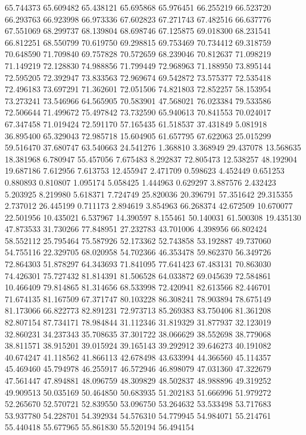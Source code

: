 65.744373
65.609482
65.438121
65.695868
65.976451
66.255219
66.523720
66.293763
66.923998
66.973336
67.602823
67.271743
67.482516
66.637776
67.551069
68.299737
68.139804
68.698746
67.125875
69.018300
68.231541
66.812251
68.550799
70.619750
69.298815
69.753469
70.734412
69.318759
70.648590
71.709840
69.757828
70.572659
68.239046
70.812637
71.098219
71.149219
72.128830
74.988856
71.799449
72.968963
71.188950
73.895144
72.595205
72.392947
73.833563
72.969674
69.542872
73.575377
72.535418
72.496183
73.697291
71.362601
72.051506
74.821803
72.852257
58.153954
73.273241
73.546966
64.565905
70.583901
47.568021
76.023384
79.533586
72.506644
71.499672
75.497842
73.732590
65.940613
70.841553
70.024017
67.347458
71.019424
72.591170
57.165435
61.518537
37.431849
5.081918
36.895400
65.329043
72.985718
15.604905
61.657795
67.622063
25.015299
59.516470
37.680747
63.540663
24.541276
1.368810
3.368949
29.437078
13.568635
18.381968
6.780947
55.457056
7.675483
8.292837
72.805473
12.538257
48.192904
19.687186
7.612956
7.613753
12.455947
2.471709
0.598623
4.452449
0.651253
0.880893
0.810807
1.095174
5.058425
1.444963
0.629297
3.887576
2.432423
5.203925
8.219980
5.618371
7.724749
25.820036
20.396791
57.351642
29.315355
2.737012
26.445199
0.711173
2.894619
3.854963
66.268374
42.672509
10.670077
22.501956
10.435021
6.537967
14.390597
8.155461
50.140031
61.500308
19.435130
47.873533
31.730266
77.848951
27.232783
43.701006
4.398956
66.802424
58.552112
25.795464
75.587926
52.173362
52.743858
53.192887
49.737060
54.755116
22.329705
68.020958
54.702366
46.353478
59.862370
56.349726
72.864303
51.878297
64.343693
71.841095
77.641423
67.483131
70.863030
74.426301
75.727432
81.814391
81.506528
64.033872
69.045639
72.584861
10.466409
79.814865
81.314656
68.533998
72.420941
82.613566
82.446701
71.674135
81.167509
67.371747
80.103228
86.308241
78.903894
78.675149
81.173066
66.822773
82.891231
72.973713
85.269383
83.750406
81.361208
82.807154
87.734171
78.984844
31.112346
31.819329
31.877937
32.123019
32.860231
34.237343
35.708635
37.301722
38.066629
38.552698
38.779068
38.811571
38.915201
39.015924
39.165143
39.292912
39.646273
40.191082
40.674247
41.118562
41.866113
42.678498
43.633994
44.366560
45.114357
45.469460
45.794978
46.255917
46.572946
46.898079
47.031360
47.322679
47.561447
47.894881
48.096759
48.309829
48.502837
48.988896
49.319252
49.909513
50.035169
50.464850
50.683935
51.202183
51.666996
51.979272
52.265670
52.570721
52.839550
53.096750
53.264632
53.533498
53.717683
53.937780
54.228701
54.392934
54.576310
54.779945
54.984071
55.214761
55.440418
55.677965
55.861830
55.520194
56.494154
